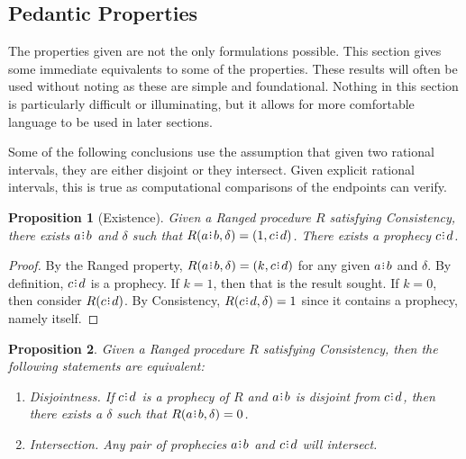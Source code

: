 \documentclass[12pt]{article}
\newtheorem{proposition}{Proposition}[section]
\begin{document}
\subsection{Pedantic Properties }

The properties given are not the only formulations possible. This section gives some immediate equivalents to some of the properties. These results will often be used without noting as these are simple and foundational. Nothing in this section is particularly difficult or illuminating, but it allows for more comfortable language to be used in later sections. 

Some of the following conclusions use the assumption that given two rational intervals, they are either disjoint or they intersect. Given explicit rational intervals, this is true as computational comparisons of the endpoints can verify. 


\begin{proposition}[Existence]
    Given a Ranged procedure $R$ satisfying Consistency, there exists $a \rint b$ and $\delta$ such that $R(a \rint b, \delta) = (1, c\rint d)$. There exists a prophecy $c \rint d$.
\end{proposition}

\begin{proof}
    By the Ranged property, $R(a\rint b, \delta) = (k, c\rint d)$ for any given $a\rint b$ and $\delta$. By definition, $c\rint d$ is a prophecy. If $k = 1$, then that is the result sought. If $k=0$, then consider $R(c\rint d)$. By Consistency, $R(c\rint d, \delta) = 1$ since it contains a prophecy, namely itself.
\end{proof}



\begin{proposition}\label{os-prointer}
    Given a Ranged procedure $R$ satisfying Consistency, then the following statements are equivalent: 
    \begin{enumerate}
        \item Disjointness. 
           If $c\rint d$ is a prophecy of $R$ and $a\rint b$ is disjoint from $c\rint d$, then there exists a $\delta$ such that $R(a\rint b, \delta) = 0$.
        \item Intersection. Any pair of prophecies $a\rint b$ and $c\rint d$ will intersect. 
    \end{enumerate} 
\end{proposition}
\end{document}
